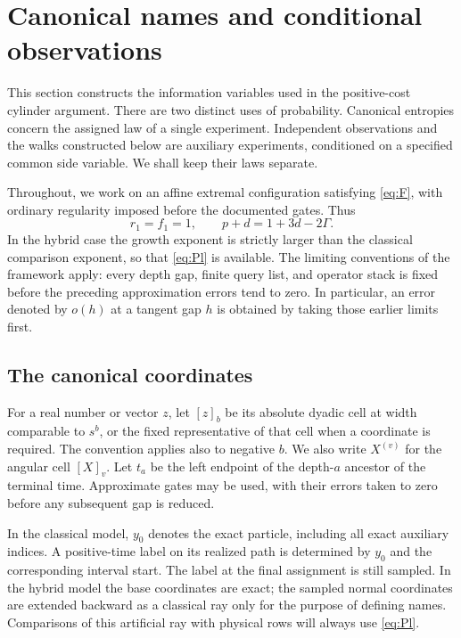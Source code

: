 \section{Canonical names and conditional observations}
\label{names:section}

This section constructs the information variables used in the positive-cost
cylinder argument. There are two distinct uses of probability. Canonical
entropies concern the assigned law of a single experiment. Independent
observations and the walks constructed below are auxiliary experiments,
conditioned on a specified common side variable. We shall keep their laws
separate.

Throughout, we work on an affine extremal configuration satisfying
\eqref{eq:F}, with ordinary regularity imposed before the documented gates.
Thus
\[
 r_1=f_1=1,\qquad p+d=1+3d-2\Gamma.
\]
In the hybrid case the growth exponent is strictly larger than the
classical comparison exponent, so that \eqref{eq:Pl} is available.
The limiting conventions of the framework apply: every depth gap, finite
query list, and operator stack is fixed before the preceding approximation
errors tend to zero. In particular, an error denoted by \(o(h)\) at a
tangent gap \(h\) is obtained by taking those earlier limits first.

\subsection{The canonical coordinates}

For a real number or vector \(z\), let \([z]_b\) be its absolute dyadic
cell at width comparable to \(s^b\), or the fixed representative of that
cell when a coordinate is required. The convention applies also to
negative \(b\). We also write \(X^{(v)}\) for the angular cell
\([X]_v\). Let \(t_a\) be the left endpoint of the depth-\(a\)
ancestor of the terminal time. Approximate gates may be used, with their
errors taken to zero before any subsequent gap is reduced.

In the classical model, \(y_0\) denotes the exact particle, including all
exact auxiliary indices. A positive-time label on its realized path is
determined by \(y_0\) and the corresponding interval start. The label at
the final assignment is still sampled. In the hybrid model the base
coordinates are exact; the sampled normal coordinates are extended
backward as a classical ray only for the purpose of defining names.
Comparisons of this artificial ray with physical rows will always use
\eqref{eq:Pl}.

